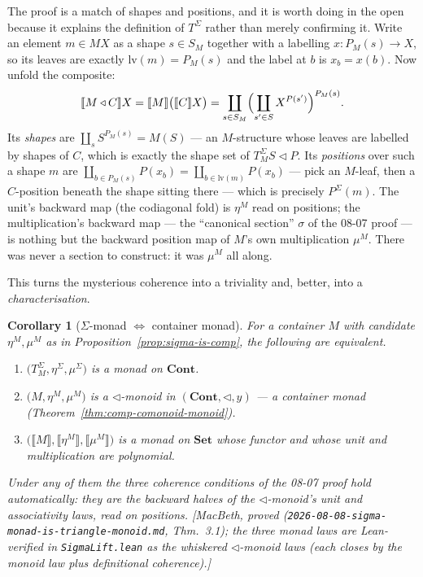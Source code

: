 \documentclass[11pt,a4paper]{book}
\newcommand{\Set}{\mathbf{Set}}
\newcommand{\Cont}{\mathbf{Cont}}
\newcommand{\y}{y}
\newcommand{\cont}[2]{#1 \triangleleft #2}
\newcommand{\Ext}[1]{\llbracket #1 \rrbracket}
\theoremstyle{plain}
\newtheorem{Corollary}[Theorem]{Corollary}
\theoremstyle{definition}
\theoremstyle{remark}
\newcommand{\prov}[1]{\hfill\textsf{\footnotesize[#1]}}
\begin{document}
The proof is a match of shapes and positions, and it is worth doing in the open because it explains
the definition of $T^{\Sigma}$ rather than merely confirming it. Write an element $m\in M X$ as a
shape $s\in S_{M}$ together with a labelling $x\colon P_{M}(s)\to X$, so its leaves are exactly
$\mathrm{lv}(m)=P_{M}(s)$ and the label at $b$ is $x_{b}=x(b)$. Now unfold the composite:
\[
  \Ext{M\triangleleft C}X=\Ext{M}\bigl(\Ext{C}X\bigr)
  =\coprod_{s\in S_{M}}\Bigl(\coprod_{s'\in S}X^{P(s')}\Bigr)^{P_{M}(s)}.
\]
Its \emph{shapes} are $\coprod_{s}S^{P_{M}(s)}=M(S)$ --- an $M$-structure whose leaves are labelled by
shapes of $C$, which is exactly the shape set of $T^{\Sigma}_{M}\cont S P$. Its \emph{positions} over
such a shape $m$ are $\coprod_{b\in P_{M}(s)}P(x_{b})=\coprod_{b\in\mathrm{lv}(m)}P(x_{b})$ --- pick an
$M$-leaf, then a $C$-position beneath the shape sitting there --- which is precisely $P^{\Sigma}(m)$.
The unit's backward map (the codiagonal fold) is $\eta^{M}$ read on positions; the multiplication's
backward map --- the ``canonical section'' $\sigma$ of the 08-07 proof --- is nothing but the backward
position map of $M$'s own multiplication $\mu^{M}$. There was never a section to construct: it was
$\mu^{M}$ all along.

This turns the mysterious coherence into a triviality and, better, into a \emph{characterisation}.

\begin{Corollary}[$\Sigma$-monad $\Leftrightarrow$ container monad]\label{cor:sigma-monad}
For a container $M$ with candidate $\eta^{M},\mu^{M}$ as in Proposition~\ref{prop:sigma-is-comp}, the
following are equivalent.
\begin{enumerate}[nosep,label=\textup{(\arabic*)}]
  \item $\bigl(T^{\Sigma}_{M},\eta^{\Sigma},\mu^{\Sigma}\bigr)$ is a monad on $\Cont$.
  \item $\bigl(M,\eta^{M},\mu^{M}\bigr)$ is a $\triangleleft$-monoid in $(\Cont,\triangleleft,\y)$ ---
        a \emph{container monad} (Theorem~\ref{thm:comp-comonoid-monoid}).
  \item $\bigl(\Ext M,\Ext{\eta^{M}},\Ext{\mu^{M}}\bigr)$ is a monad on $\Set$ whose functor
        \emph{and} whose unit and multiplication are polynomial.
\end{enumerate}
Under any of them the three coherence conditions of the 08-07 proof hold \emph{automatically}: they
are the backward halves of the $\triangleleft$-monoid's unit and associativity laws, read on positions.
\prov{MacBeth, proved (\texttt{2026-08-08-sigma-monad-is-triangle-monoid.md}, Thm.~3.1); the three
monad laws are Lean-verified in \texttt{SigmaLift.lean} as the whiskered $\triangleleft$-monoid laws
(each closes by the monoid law plus definitional coherence).}
\end{Corollary}
\end{document}
